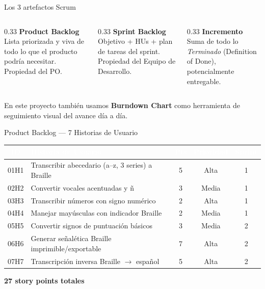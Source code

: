 \documentclass[11pt,aspectratio=169]{beamer}
\begin{document}
\begin{frame}{Los 3 artefactos Scrum}
  \begin{columns}[T]
    \begin{column}{0.33\textwidth}
      \textbf{Product Backlog}\\
      \small Lista priorizada y viva de todo lo que el producto podría necesitar. Propiedad del PO.
    \end{column}
    \begin{column}{0.33\textwidth}
      \textbf{Sprint Backlog}\\
      \small Objetivo + HUs + plan de tareas del sprint. Propiedad del Equipo de Desarrollo.
    \end{column}
    \begin{column}{0.33\textwidth}
      \textbf{Incremento}\\
      \small Suma de todo lo \emph{Terminado} (Definition of Done), potencialmente entregable.
    \end{column}
  \end{columns}
  \vspace{0.5cm}
  \begin{alertblock}{En este proyecto también usamos}
    \textbf{Burndown Chart} como herramienta de seguimiento visual del avance día a día.
  \end{alertblock}
\end{frame}

\begin{frame}{Product Backlog --- 7 Historias de Usuario}
  \begin{center}
  \scriptsize
  \renewcommand{\arraystretch}{1.3}
  \begin{tabular}{|c|p{5.4cm}|c|c|c|}
    \hline
    \rowcolor{epnblue}
    \textcolor{white}{ID} & \textcolor{white}{Historia de Usuario} & \textcolor{white}{Pts} & \textcolor{white}{Prioridad} & \textcolor{white}{Sprint} \\
    \hline
    01H1 & Transcribir abecedario (a--z, 3 series) a Braille & 5 & Alta & 1 \\
    \rowcolor{epnrow} 02H2 & Convertir vocales acentuadas y ñ & 3 & Media & 1 \\
    03H3 & Transcribir números con signo numérico & 2 & Alta & 1 \\
    \rowcolor{epnrow} 04H4 & Manejar mayúsculas con indicador Braille & 2 & Media & 1 \\
    05H5 & Convertir signos de puntuación básicos & 3 & Media & 2 \\
    \rowcolor{epnrow} 06H6 & Generar señalética Braille imprimible/exportable & 7 & Alta & 2 \\
    07H7 & Transcripción inversa Braille $\rightarrow$ español & 5 & Alta & 2 \\
    \hline
  \end{tabular}

  \vspace{0.3cm}
  \normalsize \textbf{27 story points totales}
  \end{center}
\end{frame}
\end{document}
